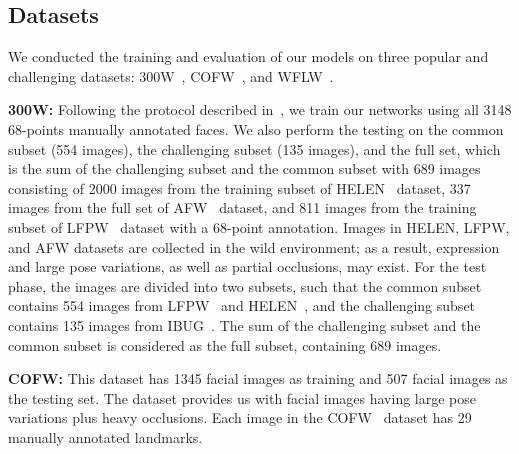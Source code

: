 \documentclass[times,twocolumn,final,authoryear]{elsarticle}
\begin{document}
\subsection{Datasets} \label{sec:datasets} 
We conducted the training and evaluation of our models on three popular and challenging datasets: 300W~\cite{sagonas2013300}, COFW~\cite{burgos2013robust}, and WFLW~\cite{wu2018look}. 

\textbf{300W:} Following the protocol described in~\cite{ren2014face}, we train our networks using all 3148 68-points manually annotated faces. We also perform the testing on the common subset (554 images), the challenging subset (135 images), and the full set, which is the sum of the challenging subset and the common subset with 689 images consisting of 2000 images from the training subset of HELEN~\cite{le2012interactive} dataset, 337 images from the full set of AFW~\cite{zhu2012face} dataset, and 811 images from the training subset of LFPW~\cite{belhumeur2013localizing} dataset with a 68-point annotation. Images in HELEN, LFPW, and AFW datasets are collected in the wild environment; as a result, expression and large pose variations, as well as partial occlusions, may exist. For the test phase, the images are divided into two subsets, such that the common subset contains 554 images from LFPW~\cite{belhumeur2013localizing} and HELEN~\cite{le2012interactive}, and the challenging subset contains 135 images from IBUG~\cite{sagonas2013300}. The sum of the challenging subset and the common subset is considered as the full subset, containing 689 images.

\textbf{COFW:} This dataset has 1345 facial images as training and 507 facial images as the testing set. The dataset provides us with facial images having large pose variations plus heavy occlusions. Each image in the COFW~\cite{burgos2013robust} dataset has 29 manually annotated landmarks.
\end{document}
